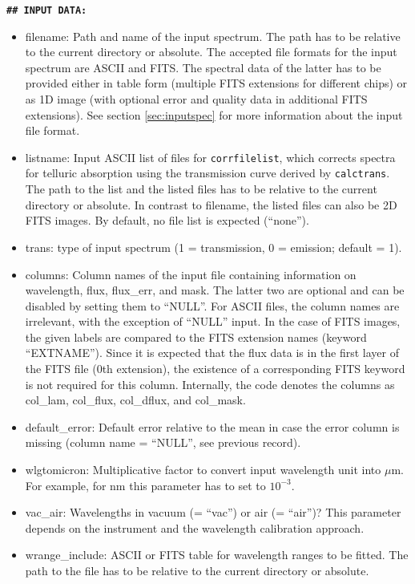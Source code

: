 {\bf\large\tt\#\# INPUT DATA:}
\begin{itemize}
\item {\sc filename}: Path and name of the input spectrum. The path has to be
relative to the current directory or absolute. The accepted file formats for the
input spectrum are ASCII and FITS. The spectral data of the latter has to be
provided either in table form (multiple FITS extensions for different chips) or
as 1D image (with optional error and quality data in additional FITS
extensions).  See section \ref{sec:inputspec} for more information about the
input file format.
\item {\sc listname}: Input ASCII list of files for {\tt corrfilelist}, which
corrects spectra for telluric absorption using the transmission curve derived
by {\tt calctrans}. The path to the list and the listed files has to be
relative to the current directory or absolute. In contrast to {\sc filename}, the
listed files can also be 2D FITS images. By default, no file list is expected
(``none'').
\item {\sc trans}: type of input spectrum (1 = transmission, 0 = emission;
default = 1).
\item {\sc columns}: Column names of the input file containing information on
wavelength, flux, flux\_err, and mask. The latter two are optional and can be
disabled by setting them to ``NULL''. For ASCII files, the column names are
irrelevant, with the exception of ``NULL'' input. In the case of FITS images,
the given labels are compared to the FITS extension names (keyword
``EXTNAME''). Since it is expected that the flux data is in the first layer of
the FITS file (0th extension), the existence of a corresponding FITS keyword is
not required for this column. Internally, the code denotes the columns as
{\sc col\_lam}, {\sc col\_flux}, {\sc col\_dflux}, and {\sc col\_mask}.
\item {\sc default\_error}: Default error relative to the mean in case
the error column is missing (column name = ``NULL'', see previous
record).
\item {\sc wlgtomicron}: Multiplicative factor to convert input wavelength unit
into $\mu$m. For example, for nm this parameter has to set to $10^{-3}$.
\item {\sc vac\_air}: Wavelengths in vacuum (= ``vac'') or air (= ``air'')?
This parameter depends on the instrument and the wavelength calibration
approach.
\item {\sc wrange\_include}: ASCII or FITS table for wavelength ranges to be
fitted. The path to the file has to be relative to the current directory or absolute.

\end{itemize}
